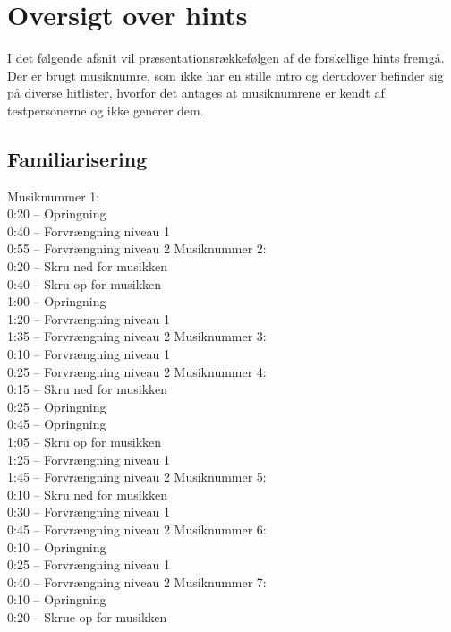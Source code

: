 \chapter{Oversigt over hints}
\label{app:OversigtHints}
%
I det følgende afsnit vil præsentationsrækkefølgen af de forskellige hints fremgå. Der er brugt musiknumre, som ikke har en stille intro og derudover befinder sig på diverse hitlister, hvorfor det antages at musiknumrene er kendt af testpersonerne og ikke generer dem. 
\section{Familiarisering}
Musiknummer 1:\\
0:20 – Opringning\\
0:40 – Forvrængning niveau 1\\
0:55 – Forvrængning niveau 2\blankline
%
Musiknummer 2:\\
0:20 – Skru ned for musikken\\
0:40 – Skru op for musikken\\
1:00 – Opringning\\
1:20 – Forvrængning niveau 1\\
1:35 – Forvrængning niveau 2\blankline
%
Musiknummer 3:\\
0:10 – Forvrængning niveau 1\\
0:25 – Forvrængning niveau 2\blankline
%
Musiknummer 4:\\
0:15 – Skru ned for musikken\\
0:25 – Opringning\\
0:45 – Opringning\\
1:05 – Skru op for musikken\\
1:25 – Forvrængning niveau 1\\
1:45 – Forvrængning niveau 2\blankline 
%
Musiknummer 5:\\
0:10 – Skru ned for musikken\\
0:30 – Forvrængning niveau 1\\
0:45 – Forvrængning niveau 2\blankline 
%
Musiknummer 6:\\
0:10 – Opringning\\
0:25 – Forvrængning niveau 1\\
0:40 – Forvrængning niveau 2\blankline
%
Musiknummer 7:\\
0:10 – Opringning\\
0:20 – Skrue op for musikken
%
